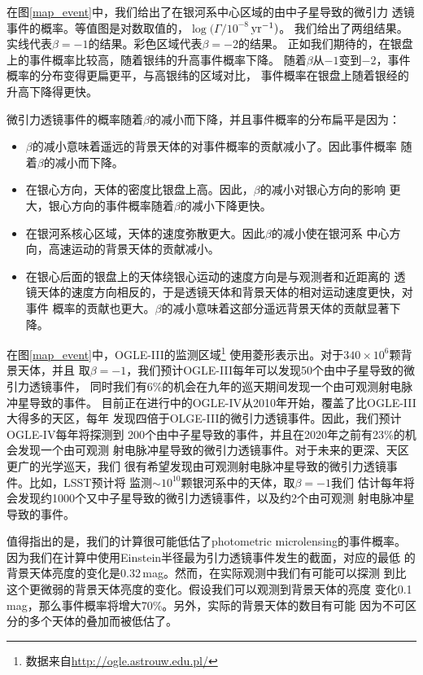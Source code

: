 在图\ref{map_event}中，我们给出了在银河系中心区域的由中子星导致的微引力
透镜事件的概率。等值图是对数取值的，$\log(\Gamma/10^{-8}$\,$\rm{yr^{-1}})$。
我们给出了两组结果。实线代表$\beta=-1$的结果。彩色区域代表$\beta=-2$的结果。
正如我们期待的，在银盘上的事件概率比较高，随着银纬的升高事件概率下降。
随着$\beta$从$-1$变到$-2$，事件概率的分布变得更扁更平，与高银纬的区域对比，
事件概率在银盘上随着银经的升高下降得更快。

微引力透镜事件的概率随着$\beta$的减小而下降，并且事件概率的分布扁平是因为：
\begin{itemize}
\item $\beta$的减小意味着遥远的背景天体的对事件概率的贡献减小了。因此事件概率
随着$\beta$的减小而下降。
\item 在银心方向，天体的密度比银盘上高。因此，$\beta$的减小对银心方向的影响
更大，银心方向的事件概率随着$\beta$的减小下降更快。
\item 在银河系核心区域，天体的速度弥散更大。因此$\beta$的减小使在银河系
中心方向，高速运动的背景天体的贡献减小。
\item 在银心后面的银盘上的天体绕银心运动的速度方向是与观测者和近距离的
透镜天体的速度方向相反的，于是透镜天体和背景天体的相对运动速度更快，对事件
概率的贡献也更大。$\beta$的减小意味着这部分遥远背景天体的贡献显著下降。
\end{itemize}

在图\ref{map_event}中，OGLE-III的监测区域\footnote{数据来自\url{http://ogle.astrouw.edu.pl/}}
使用菱形表示出。对于$340\times10^6$颗背景天体\supercite{Szymanski}，并且
取$\beta=-1$，我们预计OGLE-III每年可以发现50个由中子星导致的微引力透镜事件，
同时我们有6\%的机会在九年的巡天期间发现一个由可观测射电脉冲星导致的事件。
目前正在进行中的OGLE-IV从2010年开始，覆盖了比OGLE-III大得多的天区，每年
发现四倍于OLGE-III的微引力透镜事件。因此，我们预计OGLE-IV每年将探测到
200个由中子星导致的事件，并且在2020年之前有23\%的机会发现一个由可观测
射电脉冲星导致的微引力透镜事件。对于未来的更深、天区更广的光学巡天，我们
很有希望发现由可观测射电脉冲星导致的微引力透镜事件。比如，LSST预计将
监测$\sim10^{10}$颗银河系中的天体\supercite{ivez12a}，取$\beta=-1$我们
估计每年将会发现约1000个又中子星导致的微引力透镜事件，以及约2个由可观测
射电脉冲星导致的事件。

值得指出的是，我们的计算很可能低估了photometric microlensing的事件概率。
因为我们在计算中使用Einstein半径最为引力透镜事件发生的截面，对应的最低
的背景天体亮度的变化是0.32\,mag。然而，在实际观测中我们有可能可以探测
到比这个更微弱的背景天体亮度的变化。假设我们可以观测到背景天体的亮度
变化0.1\,mag，那么事件概率将增大70\%。另外，实际的背景天体的数目有可能
因为不可区分的多个天体的叠加而被低估了\supercite{Smith07}。
  
